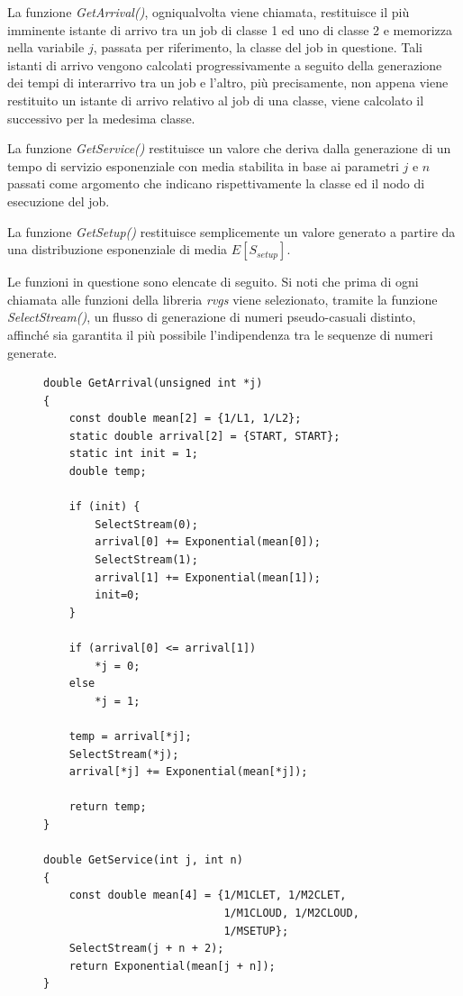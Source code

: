 La funzione \emph{GetArrival()}, ogniqualvolta viene chiamata, restituisce il
più imminente istante di arrivo tra un job di classe 1 ed uno di classe 2 e
memorizza nella variabile $j$, passata per riferimento, la classe del job in
questione. Tali istanti di arrivo vengono calcolati progressivamente a seguito
della generazione dei tempi di interarrivo tra un job e l’altro, più
precisamente, non appena viene restituito un istante di arrivo relativo al job
di una classe, viene calcolato il successivo per la medesima classe.

La funzione \emph{GetService()} restituisce un valore che deriva dalla
generazione di un tempo di servizio esponenziale con media stabilita in base ai
parametri $j$ e $n$ passati come argomento che indicano rispettivamente la
classe ed il nodo di esecuzione del job.

La funzione \emph{GetSetup()} restituisce semplicemente un valore generato a
partire da una distribuzione esponenziale di media $E[S_{setup}]$.

Le funzioni in questione sono elencate di seguito. Si noti che prima di ogni
chiamata alle funzioni della libreria \emph{rvgs} viene selezionato, tramite la
funzione \emph{SelectStream()}, un flusso di generazione di numeri
pseudo-casuali distinto, affinché sia garantita il più possibile l’indipendenza
tra le sequenze di numeri generate.  
%
\begin{figure}[!h]
\begin{lstlisting}[title=basic.h]
double GetArrival(unsigned int *j)
{
    const double mean[2] = {1/L1, 1/L2};
    static double arrival[2] = {START, START};
    static int init = 1;
    double temp;

    if (init) {
        SelectStream(0);
        arrival[0] += Exponential(mean[0]);
        SelectStream(1);
        arrival[1] += Exponential(mean[1]);
        init=0;
    }

    if (arrival[0] <= arrival[1])
        *j = 0;
    else
        *j = 1;

    temp = arrival[*j];
    SelectStream(*j);
    arrival[*j] += Exponential(mean[*j]);
 
    return temp;
}              
             
double GetService(int j, int n)
{                            
    const double mean[4] = {1/M1CLET, 1/M2CLET,
                            1/M1CLOUD, 1/M2CLOUD, 
                            1/MSETUP};
    SelectStream(j + n + 2);               
    return Exponential(mean[j + n]);      
}                                       
\end{lstlisting}
\end{figure}
%
%
